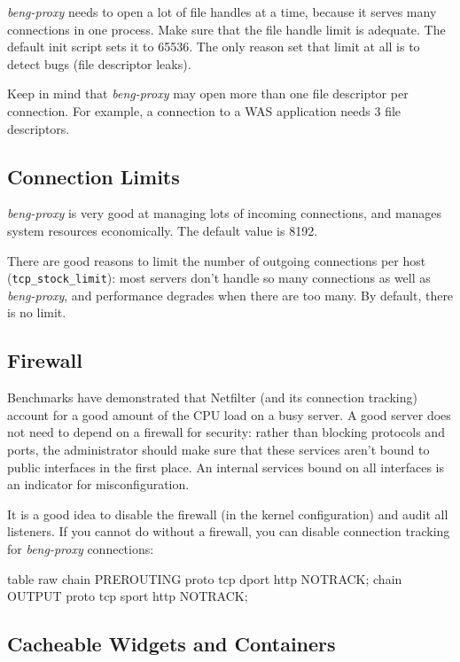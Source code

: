 \documentclass[a4paper,12pt]{article}
\begin{document}
\emph{beng-proxy} needs to open a lot of file handles at a time,
because it serves many connections in one process.  Make sure that the
file handle limit is adequate.  The default init script sets it to
65536.  The only reason set that limit at all is to detect bugs (file
descriptor leaks).

Keep in mind that \emph{beng-proxy} may open more than one file
descriptor per connection.  For example, a connection to a WAS
application needs 3 file descriptors.

\subsection{Connection Limits}

\emph{beng-proxy} is very good at managing lots of incoming
connections, and manages system resources economically.  The default
value is 8192.

There are good reasons to limit the number of outgoing connections per
host (\verb|tcp_stock_limit|): most servers don't handle so many
connections as well as \emph{beng-proxy}, and performance degrades
when there are too many.  By default, there is no limit.

\subsection{Firewall}

Benchmarks have demonstrated that Netfilter (and its connection
tracking) account for a good amount of the CPU load on a busy server.
A good server does not need to depend on a firewall for security:
rather than blocking protocols and ports, the administrator should
make sure that these services aren't bound to public interfaces in the
first place.  An internal services bound on all interfaces is an
indicator for misconfiguration.

It is a good idea to disable the firewall (in the kernel
configuration) and audit all listeners.  If you cannot do without a
firewall, you can disable connection tracking for \emph{beng-proxy}
connections:

\begin{verbatim*}
table raw {
  chain PREROUTING proto tcp dport http NOTRACK;
  chain OUTPUT proto tcp sport http NOTRACK;
}
\end{verbatim*}

\subsection{Cacheable Widgets and Containers}
\end{document}
